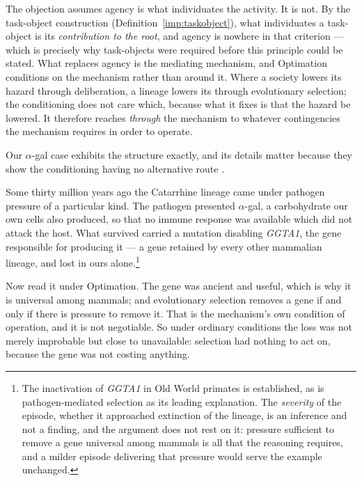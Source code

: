 \noindent The objection assumes agency is what individuates the
activity. It is not. By the task-object construction (Definition~\ref{imp:taskobject}), what individuates a task-object
is its \emph{contribution to the root}, and agency is nowhere in that
criterion --- which is precisely why task-objects were required before
this principle could be stated. What replaces agency is the mediating mechanism, and Optimation
conditions on the mechanism rather than around it. Where a society
lowers its hazard through deliberation, a lineage lowers its through
evolutionary selection; the conditioning does not care which, because
what it fixes is that the hazard be lowered. It therefore reaches
\emph{through} the mechanism to whatever contingencies the mechanism
requires in order to operate.

\begin{example}\label{gc:ex:medium}
Our $\alpha$-gal case exhibits the structure exactly, and its
details matter because they show the conditioning having no alternative
route \cite{Nexus}.

Some thirty million years ago the Catarrhine lineage came under
pathogen pressure of a particular kind. The pathogen presented
$\alpha$-gal, a carbohydrate our own cells also produced, so that no
immune response was available which did not attack the host. What
survived carried a mutation disabling \textit{GGTA1}, the gene
responsible for producing it --- a gene retained by every other
mammalian lineage, and lost in ours alone.\footnote{The inactivation of
\textit{GGTA1} in Old World primates is established, as is
pathogen-mediated selection as its leading explanation. The
\emph{severity} of the episode, whether it approached extinction of
the lineage, is an inference and not a finding, and the argument does
not rest on it: pressure sufficient to remove a gene universal among
mammals is all that the reasoning requires, and a milder episode
delivering that pressure would serve the example unchanged.}

Now read it under Optimation. The gene was ancient and useful, which is
why it is universal among mammals; and evolutionary selection removes a
gene if and only if there is pressure to remove it. That is the
mechanism's own condition of operation, and it is not negotiable. So
under ordinary conditions the loss was not merely improbable but close
to unavailable: selection had nothing to act on, because the gene was
not costing anything.


\end{example}
